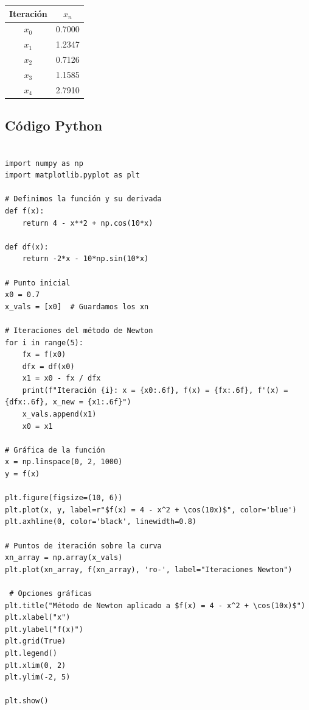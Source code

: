 \documentclass[12pt]{article}
\begin{document}
\begin{center}
\begin{center}
\begin{tabular}{|c|c|}
\hline
Iteración & \(x_n\)   \\ \hline
\(x_0\)   & 0.7000    \\
\(x_1\)   & 1.2347    \\
\(x_2\)   & 0.7126    \\
\(x_3\)   & 1.1585    \\
\(x_4\)   & 2.7910    \\ \hline
\end{tabular}
\end{center}

\subsection*{Código Python}

\begin{tcolorbox}[title=Codigo python,
                  colback=white,
                  colframe=black,
                  breakable, enhanced]
\begin{lstlisting}[style=mypython]

import numpy as np
import matplotlib.pyplot as plt

# Definimos la función y su derivada
def f(x):
    return 4 - x**2 + np.cos(10*x)

def df(x):
    return -2*x - 10*np.sin(10*x)

# Punto inicial
x0 = 0.7
x_vals = [x0]  # Guardamos los xn

# Iteraciones del método de Newton
for i in range(5):
    fx = f(x0)
    dfx = df(x0)
    x1 = x0 - fx / dfx
    print(f"Iteración {i}: x = {x0:.6f}, f(x) = {fx:.6f}, f'(x) = {dfx:.6f}, x_new = {x1:.6f}")
    x_vals.append(x1)
    x0 = x1

# Gráfica de la función
x = np.linspace(0, 2, 1000)
y = f(x)

plt.figure(figsize=(10, 6))
plt.plot(x, y, label=r"$f(x) = 4 - x^2 + \cos(10x)$", color='blue')
plt.axhline(0, color='black', linewidth=0.8)

# Puntos de iteración sobre la curva
xn_array = np.array(x_vals)
plt.plot(xn_array, f(xn_array), 'ro-', label="Iteraciones Newton")

 # Opciones gráficas
plt.title("Método de Newton aplicado a $f(x) = 4 - x^2 + \cos(10x)$")
plt.xlabel("x")
plt.ylabel("f(x)")
plt.grid(True)
plt.legend()
plt.xlim(0, 2)
plt.ylim(-2, 5)

plt.show()

\end{lstlisting}
\end{tcolorbox}


\end{center}
\end{document}
